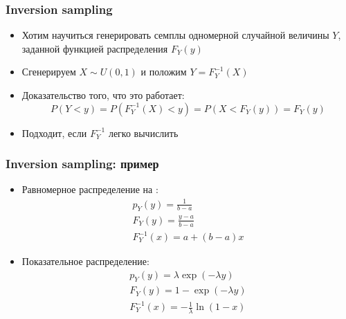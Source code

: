 \documentclass[10pt]{beamer}
\begin{document}
\begin{frame}[fragile]
\frametitle{Inversion sampling}
\begin{itemize}
\item Хотим научиться генерировать семплы одномерной случайной величины \begin{math}Y\end{math}, заданной функцией распределения \begin{math}F_Y(y)\end{math}
\pause
\item Сгенерируем \begin{math}X\sim U(0,1)\end{math} и положим \begin{math}Y = F_Y^{-1}(X)\end{math}
\pause
\item Доказательство того, что это работает:
\begin{equation*}
P(Y < y) = P(F_Y^{-1}(X) < y) = P(X < F_Y(y)) = F_Y(y)
\end{equation*}
\pause
\item Подходит, если \begin{math}F_Y^{-1}\end{math} легко вычислить
\end{itemize}
\end{frame}

\begin{frame}[fragile]
\frametitle{Inversion sampling: пример}
\begin{itemize}
\item Равномерное распределение на \begin{math}[a, b]\end{math}:
\begin{gather*}
p_Y(y) = \frac{1}{b-a} \\
F_Y(y) = \frac{y-a}{b-a} \\
F_Y^{-1}(x) = a + (b-a)x
\end{gather*}
\pause
\item Показательное распределение:
\begin{gather*}
p_Y(y) = \lambda\exp(-\lambda y) \\
F_Y(y) = 1 - \exp(-\lambda y) \\
F_Y^{-1}(x) = -\frac{1}{\lambda}\ln(1-x)
\end{gather*}
\end{itemize}
\end{frame}
\end{document}
